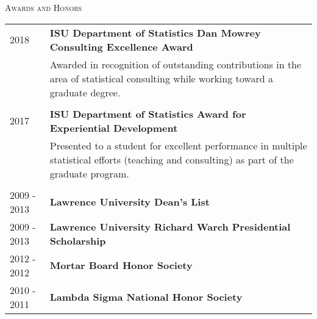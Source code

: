 \documentclass[10pt, oneside]{article}
\begin{document}
\noindent \textsc{Awards and Honors} \hrulefill
\begin{longtable}{p{3.5cm}p{13cm}}
\hfill{2018} & \textbf{ISU Department of Statistics Dan Mowrey Consulting Excellence Award}\\
& Awarded in recognition of outstanding contributions in the area of statistical consulting while working toward a graduate degree.\\
\\
\hfill{2017} & \textbf{ISU Department of Statistics Award for Experiential Development}\\
& Presented to a student for excellent performance in multiple statistical efforts (teaching and consulting) as part of the graduate program.\\
\\
\hfill{2009 - 2013} & \textbf{Lawrence University Dean’s List}\\
\hfill{2009 - 2013} & \textbf{Lawrence University Richard Warch Presidential Scholarship}\\
\hfill{2012 - 2012} & \textbf{Mortar Board Honor Society}\\
\hfill{2010 - 2011} & \textbf{Lambda Sigma National Honor Society}
\end{longtable}
\end{document}
